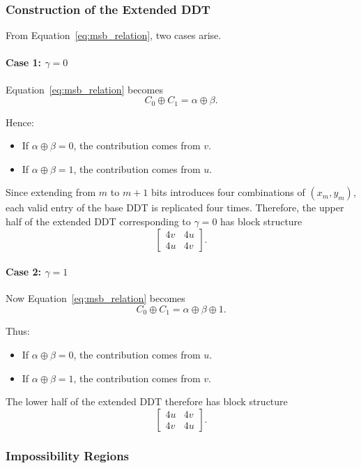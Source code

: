 \documentclass[runningheads]{llncs}
\begin{document}
\subsubsection*{Construction of the Extended DDT}

From Equation~\eqref{eq:msb_relation}, two cases arise.

\paragraph{Case 1: $\gamma = 0$}

Equation~\eqref{eq:msb_relation} becomes
\[
C_0 \oplus C_1 = \alpha \oplus \beta.
\]

Hence:
\begin{itemize}
    \item If $\alpha \oplus \beta = 0$, the contribution comes from $v$.
    \item If $\alpha \oplus \beta = 1$, the contribution comes from $u$.
\end{itemize}

Since extending from $m$ to $m+1$ bits introduces four combinations of $(x_m, y_m)$, each valid entry of the base DDT is replicated four times. Therefore, the upper half of the extended DDT corresponding to $\gamma = 0$ has block structure
\[
\begin{bmatrix}
4v & 4u \\
4u & 4v
\end{bmatrix}.
\]

\paragraph{Case 2: $\gamma = 1$}

Now Equation~\eqref{eq:msb_relation} becomes
\[
C_0 \oplus C_1 = \alpha \oplus \beta \oplus 1.
\]

Thus:
\begin{itemize}
    \item If $\alpha \oplus \beta = 0$, the contribution comes from $u$.
    \item If $\alpha \oplus \beta = 1$, the contribution comes from $v$.
\end{itemize}

The lower half of the extended DDT therefore has block structure
\[
\begin{bmatrix}
4u & 4v \\
4v & 4u
\end{bmatrix}.
\]

\subsubsection*{Impossibility Regions}
\end{document}
